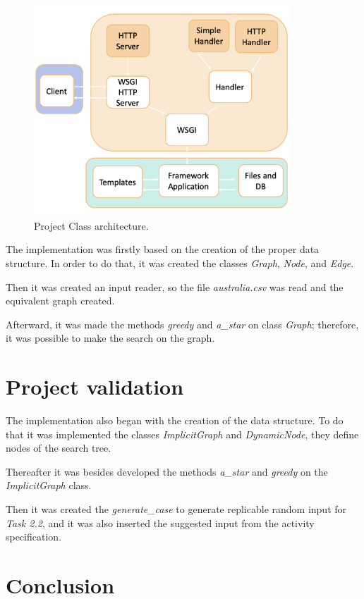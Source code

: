 \documentclass[journal,12pt,onecolumn,draftclsnofoot,]{IEEEtran}
\let\i\textit
\begin{document}
\begin{figure}
  \begin{center}
  \includegraphics[width=3.8in]{./imgs/project.png}
  \caption{Project Class architecture.}
  \label{fig_project}
  \end{center}
\end{figure}

The implementation was firstly based on the creation of the proper data structure. In order to do that, it was created the classes \i{Graph}, \i{Node}, and \i{Edge}.

Then it was created an input reader, so the file \i{australia.csv} was read and the equivalent graph created.

Afterward, it was made the methods \i{greedy} and \i{a\_star} on class \i{Graph}; therefore, it was possible to make the search on the graph.
\section{Project validation}
The implementation also began with the creation of the data structure. To do that it was implemented the classes \i{ImplicitGraph} and \i{DynamicNode}, they define nodes of the search tree.

Thereafter it was besides developed the methods \i{a\_star} and \i{greedy} on the \i{ImplicitGraph} class.

Then it was created the \i{generate\_case} to generate replicable random input for \i{Task 2.2}, and it was also inserted the suggested input from the activity specification.
\section{Conclusion}
\end{document}
